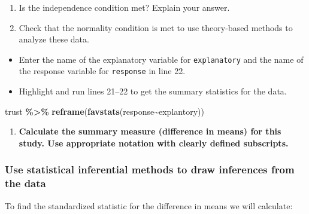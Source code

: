 \documentclass[
]{report}
\newenvironment{Shaded}{\begin{snugshade}}{\end{snugshade}}
\newcommand{\FunctionTok}[1]{\textcolor[rgb]{0.13,0.29,0.53}{\textbf{#1}}}
\newcommand{\NormalTok}[1]{#1}
\newcommand{\SpecialCharTok}[1]{\textcolor[rgb]{0.81,0.36,0.00}{\textbf{#1}}}
\providecommand{\tightlist}{%
  \setlength{\itemsep}{0pt}\setlength{\parskip}{0pt}}
\begin{document}
\begin{enumerate}
\def\labelenumi{\arabic{enumi}.}
\setcounter{enumi}{3}
\item
  Is the independence condition met? Explain your answer.
  \vspace{0.8in}
\item
  Check that the normality condition is met to use theory-based methods to analyze these data.
\end{enumerate}

\vspace{0.8in}

\begin{itemize}
\item
  Enter the name of the explanatory variable for \texttt{explanatory} and the name of the response variable for \texttt{response} in line 22.
\item
  Highlight and run lines 21--22 to get the summary statistics for the data.
\end{itemize}

\begin{Shaded}
\begin{Highlighting}[]
\NormalTok{trust }\SpecialCharTok{\%\textgreater{}\%}
  \FunctionTok{reframe}\NormalTok{(}\FunctionTok{favstats}\NormalTok{(response}\SpecialCharTok{\textasciitilde{}}\NormalTok{explantory))}
\end{Highlighting}
\end{Shaded}

\begin{enumerate}
\def\labelenumi{\arabic{enumi}.}
\setcounter{enumi}{5}
\tightlist
\item
  \textbf{Calculate the summary measure (difference in means) for this study. Use appropriate notation with clearly defined subscripts.}
\end{enumerate}

\vspace{1in}

\subsubsection*{Use statistical inferential methods to draw inferences from the data}\label{use-statistical-inferential-methods-to-draw-inferences-from-the-data-2}

To find the standardized statistic for the difference in means we will calculate:
\end{document}
